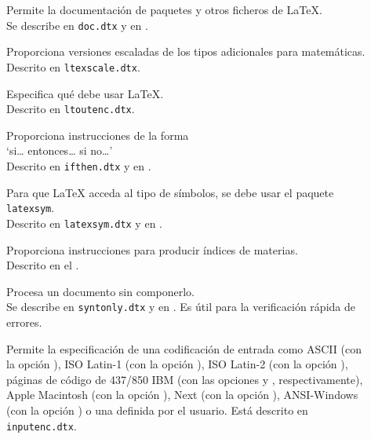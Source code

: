 \begin{table}[!hbp]
\caption{Algunos paquetes distribuidos con \LaTeX} \label{packages}
\begin{lined}{11cm}
\begin{description}

\item[\normalfont{}]  Permite la  documentación  de paquetes  y
otros  ficheros de  \LaTeX.\\  Se describe  en  \texttt{doc.dtx} y  en
\companion.

\item[\normalfont{}]   Proporciona    versiones   escaladas
de   los   tipos   adicionales   para   matemáticas.\\   Descrito   en
\texttt{ltexscale.dtx}.

\item[\normalfont{}]  Especifica  qué   debe usar \LaTeX.\\ Descrito en \texttt{ltoutenc.dtx}.

\item[\normalfont{}]   Proporciona   instrucciones   de   la
forma\\  `si\ldots{}  entonces\ldots{}   si  no\ldots'\\  Descrito  en
\texttt{ifthen.dtx} y en \companion.

\item[\normalfont{}] Para  que \LaTeX{} acceda al  tipo de
símbolos,  se debe  usar el  paquete \texttt{latexsym}.\\  Descrito en
\texttt{latexsym.dtx} y en \companion.

\item[\normalfont{}]    Proporciona   instrucciones    para
producir índices de materias.\\ Descrito en el \companion.

\item[\normalfont{}]    Procesa     un    documento    sin
componerlo.\\ Se describe en \texttt{syntonly.dtx} y en \companion. Es
útil para la verificación rápida de errores.

\item[\normalfont{}]  Permite  la  especificación  de  una
codificación de  entrada como ASCII  (con la opción  ), ISO
Latin-1  (con la  opción  ), ISO  Latin-2  (con la  opción
),  páginas de  código de  437/850 IBM  (con las  opciones
 y  , respectivamente), Apple Macintosh  (con la
opción ), Next (con  la opción ), ANSI-Windows
(con  la opción  ) o  una definida  por el  usuario. Está
descrito en \texttt{inputenc.dtx}.

\end{description}
\end{lined}
\end{table}

